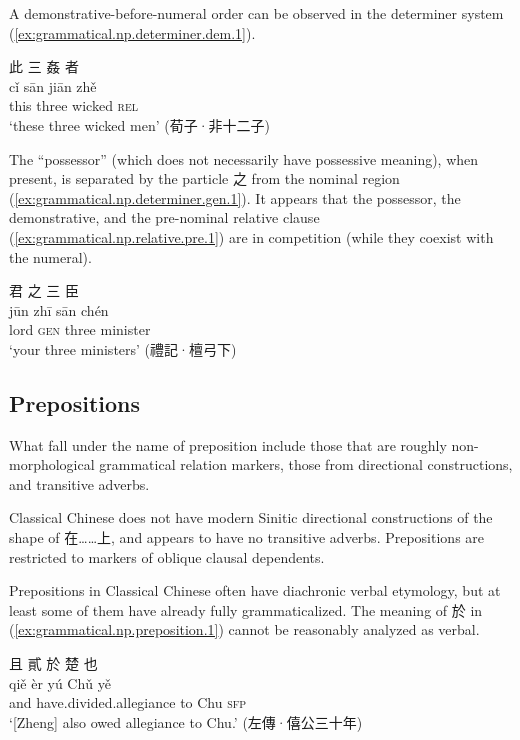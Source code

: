 \documentclass[UTF8, a4paper, oneside, scheme=plain, 12pt]{ctexrep}
\newcommand{\translate}[1]{`#1'}
\newcommand*{\category}[1]{\textsc{#1}}
\begin{document}
A demonstrative-before-numeral order can be observed in the determiner system
(\ref{ex:grammatical.np.determiner.dem.1}).

\begin{exe}
    \ex\label{ex:grammatical.np.determiner.dem.1}
    \glll
    此 三 姦 者 \\
    cǐ sān jiān zhě \\
    this three wicked \category{rel} \\
    \glt\translate{these three wicked men} \hfill (荀子·非十二子)
\end{exe}

The ``possessor'' (which does not necessarily have possessive meaning), when present, is separated by the particle 之 from the nominal region
(\ref{ex:grammatical.np.determiner.gen.1}).
It appears that the possessor, the demonstrative, and the pre-nominal relative clause (\ref{ex:grammatical.np.relative.pre.1}) are in competition 
(while they coexist with the numeral).

\begin{exe}
    \ex\label{ex:grammatical.np.determiner.gen.1}
    \glll
    君 之 三 臣 \\
    jūn zhī sān chén \\
    lord \category{gen} three minister \\
    \glt\translate{your three ministers} \hfill (禮記·檀弓下)
\end{exe}

\subsection{Prepositions}

What fall under the name of preposition include 
those that are roughly non-morphological grammatical relation markers,
those from directional constructions,
and transitive adverbs.

Classical Chinese does not have modern Sinitic directional constructions of the shape of 在……上,
and appears to have no transitive adverbs.
Prepositions are restricted to markers of oblique clausal dependents.

Prepositions in Classical Chinese often have diachronic verbal etymology,
but at least some of them have already fully grammaticalized.
The meaning of 於 in (\ref{ex:grammatical.np.preposition.1}) cannot be reasonably analyzed as verbal.

\begin{exe}
    \ex\label{ex:grammatical.np.preposition.1}
    \glll
    且 貳 於 楚 也 \\
    qiě èr yú Chǔ yě \\
    and have.divided.allegiance to Chu \category{sfp} \\
    \glt\translate{[Zheng] also owed allegiance to Chu.} \hfill (左傳·僖公三十年)
\end{exe}
\end{document}
